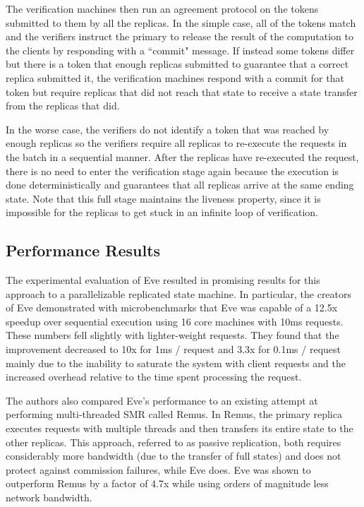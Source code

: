 \documentclass[11pt, oneside]{report}
\begin{document}
The verification machines then run an agreement protocol on the tokens submitted to them by all the replicas. In the simple case, all of the tokens match and the verifiers instruct the primary to release the result of the computation to the clients by responding with a ``commit" message. If instead some tokens differ but there is a token that enough replicas submitted to guarantee that a correct replica submitted it, the verification machines respond with a commit for that token but require replicas that did not reach that state to receive a state transfer from the replicas that did. 

In the worse case, the verifiers do not identify a token that was reached by enough replicas so the verifiers require all replicas to re-execute the requests in the batch in a sequential manner. After the replicas have re-executed the request, there is no need to enter the verification stage again because the execution is done deterministically and guarantees that all replicas arrive at the same ending state. Note that this full stage maintains the liveness property, since it is impossible for the replicas to get stuck in an infinite loop of verification.

\subsection{Performance Results}\label{EveResults}

The experimental evaluation of Eve resulted in promising results for this approach to a parallelizable replicated state machine. In particular, the creators of Eve demonstrated with microbenchmarks that Eve was capable of a 12.5x speedup over sequential execution using 16 core machines with 10ms requests. These numbers fell slightly with lighter-weight requests. They found that the improvement decreased to 10x for 1ms / request and 3.3x for 0.1ms / request mainly due to the inability to saturate the system with client requests and the increased overhead relative to the time spent processing the request.

The authors also compared Eve's performance to an existing attempt at performing multi-threaded SMR called Remus. In Remus, the primary replica executes requests with multiple threads and then transfers its entire state to the other replicas. This approach, referred to as passive replication, both requires considerably more bandwidth (due to the transfer of full states) and does not protect against commission failures, while Eve does. Eve was shown to outperform Remus by a factor of 4.7x while using orders of magnitude less network bandwidth.
\end{document}
